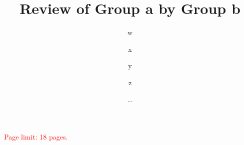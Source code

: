 \documentclass{article}
\title{\huge\sffamily\bfseries Review of Group a by Group b}
\author{ w \and x \and y \and z}
\date{\dots}
\begin{document}
\maketitle

\begin{center}
{\large\textcolor{red}{Page limit: 18 pages.}}
\end{center}

\tableofcontents
\pagebreak









\end{document}
